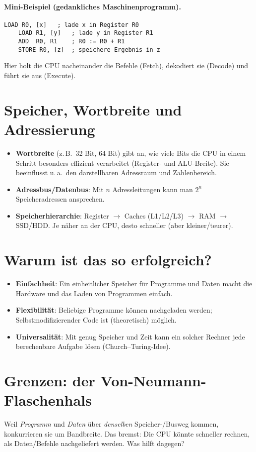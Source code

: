 \documentclass[../skript/main.tex]{subfiles}
\begin{document}
\paragraph{Mini-Beispiel (gedankliches Maschinenprogramm).}
\begin{lstlisting}[caption={Addition zweier Speicherstellen und Ablage des Ergebnisses}]
	LOAD R0, [x]   ; lade x in Register R0
	LOAD R1, [y]   ; lade y in Register R1
	ADD  R0, R1    ; R0 := R0 + R1
	STORE R0, [z]  ; speichere Ergebnis in z
\end{lstlisting}
Hier holt die CPU nacheinander die Befehle (Fetch), dekodiert sie (Decode) und führt sie aus (Execute).

\section{Speicher, Wortbreite und Adressierung}
\begin{itemize}
	\item \textbf{Wortbreite} (z.\,B.\ 32 Bit, 64 Bit) gibt an, wie viele Bits die CPU in einem Schritt besonders effizient verarbeitet
	(Register- und ALU-Breite). Sie beeinflusst u.\,a.\ den darstellbaren Adressraum und Zahlenbereich.
	\item \textbf{Adressbus/Datenbus}: Mit \(n\) Adressleitungen kann man \(2^n\) Speicheradressen ansprechen.
	\item \textbf{Speicherhierarchie}: Register \(\rightarrow\) Caches (L1/L2/L3) \(\rightarrow\) RAM \(\rightarrow\) SSD/HDD.
	Je näher an der CPU, desto schneller (aber kleiner/teurer).
\end{itemize}

\section{Warum ist das so erfolgreich?}
\begin{itemize}
	\item \textbf{Einfachheit}: Ein einheitlicher Speicher für Programme und Daten macht die Hardware und das Laden von Programmen einfach.
	\item \textbf{Flexibilität}: Beliebige Programme können nachgeladen werden; Selbstmodifizierender Code ist (theoretisch) möglich.
	\item \textbf{Universalität}: Mit genug Speicher und Zeit kann ein solcher Rechner jede berechenbare Aufgabe lösen (Church–Turing-Idee).
\end{itemize}

\section{Grenzen: der Von-Neumann-Flaschenhals}
Weil \emph{Programm} und \emph{Daten} über \emph{denselben} Speicher-/Busweg kommen, konkurrieren sie um Bandbreite.
Das bremst: Die CPU könnte schneller rechnen, als Daten/Befehle nachgeliefert werden. Was hilft dagegen?
\end{document}
